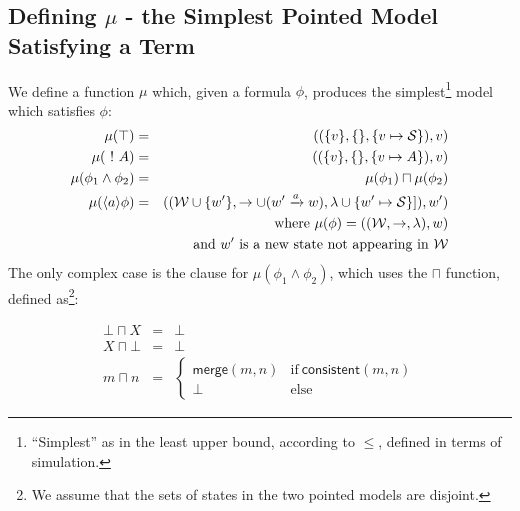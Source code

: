 \subsection{Defining $\mu$ - the Simplest Pointed Model Satisfying a Term}
We define a function $\mu$ which, given a formula $\phi$, produces the simplest\footnote{``Simplest'' as in the least upper bound, according to $\leq$, defined in terms of simulation.} model which satisfies $\phi$:
\begin{eqnarray}
\mu (\top) & = & ( (\{v\}, \{\}, \{v \mapsto \mathcal{S}\}), v) \nonumber \\
\mu (\ ! \  A) & = & ( (\{v\}, \{\}, \{v \mapsto A\}), v) \nonumber \\
\mu (\phi_1 \land \phi_2) & = & \mu(\phi_1) \sqcap \mu(\phi_2) \nonumber \\
\mu (\langle a \rangle \phi) & = & ( (\mathcal{W} \cup \{w'\}, \rightarrow \cup (w' \xrightarrow{a} w), \lambda \cup \{w' \mapsto \mathcal{S}\}]), w') \nonumber \\
		& & \mbox{where }\mu(\phi) = ( (\mathcal{W}, \rightarrow, \lambda), w) \nonumber \\
		& & \mbox{and }w' \mbox{ is a new state not appearing in }\mathcal{W} \nonumber
\end{eqnarray}
The only complex case is the clause for $\mu (\phi_1 \land \phi_2)$, which uses the $\sqcap$ function, defined as\footnote{We assume that the sets of states in the two pointed models are disjoint.}:

\begin{eqnarray*}
  \bot \sqcap X 
     & = & 
  \bot \nonumber 
     \\
  X \sqcap \bot 
     & = & 
  \bot \nonumber 
     \\
  m \sqcap n 
     & = & 
  \begin{cases}
    \mathsf{merge}(m, n) & \text{if}\ \mathsf{consistent}(m, n) \\
    \bot & \text{else}
  \end{cases}
\end{eqnarray*}

